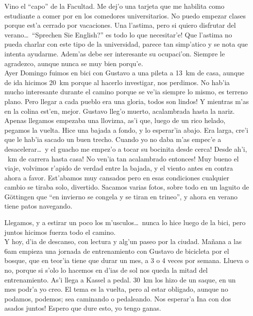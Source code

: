 Vino el ``capo'' de la Facultad. Me dej'o una tarjeta que me habilita como
estudiante a comer por  en los comedores universitarios. No
puedo empezar clases porque est'a cerrado por vacaciones. Una l'astima, pero si
quiero disfrutar del verano\ldots\ \textexclamdown ``Sprechen Sie English?'' es
todo lo que necesitar'e! Que l'astima no pueda charlar con este tipo de la
universidad, parece tan simp'atico y se nota que intenta ayudarme. Adem'as debe
ser interesante su ocupaci'on. Siempre le agradezco, aunque nunca se muy bien
porqu'e.\\

Ayer Domingo fuimos en bici con Gustavo a una pileta a 13~km de casa, aunque de
ida hicimos 20~km porque al hacerlo investigar, nos perdimos. No hab'ia mucho
interesante durante el camino porque se ve'ia siempre lo mismo, es terreno
plano. Pero llegar a cada pueblo era una gloria, \textexclamdown todos son
lindos! Y mientras m'as en la colina est'en, mejor. Gustavo lleg'o muerto,
acalambrada hasta la nariz. Apenas llegamos empezaba una llovizna, as'i que,
luego de un rico helado, pegamos la vuelta. Hice una bajada a fondo, y lo
esperar'ia abajo. Era larga, cre'i que le hab'ia sacado un buen trecho. Cuando
yo no daba m'as empec'e a desacelerar\ldots\ \textexclamdown y el guacho me
empez'o a tocar su bocinita desde cerca! Desde ah'i, ~km de
carrera hasta casa! \textexclamdown No ven'ia tan acalambrado entonces! Muy
bueno el viaje, volvimos r'apido de verdad entre la bajada, y el viento antes en
contra ahora a favor. Est'abamos muy cansados pero en esas condiciones cualquier
cambio se tiraba solo, divertido. Sacamos varias fotos, sobre todo en un laguito
de G\"ottingen que ``en invierno se congela y se tiran en trineo'', y ahora en
verano tiene patos navegando.

Llegamos, y a estirar un poco los m'usculos\ldots\ nunca lo hice luego de la
bici, pero juntos hicimos fuerza todo el camino.\\

Y hoy, d'ia de descanso, con lectura y alg'un paseo por la ciudad. Ma\~nana a
las 6am empieza una jornada de entrenamiento con Gustavo de bicicleta por el
bosque, que en teor'ia tiene que durar un mes, a 3 o 4 veces por semana. Llueva
o no, porque si s'olo lo hacemos en d'ias de sol nos queda la mitad del
entrenamiento. As'i llega a Kassel a pedal. 30~km los hizo de un saque, en un
mes podr'a yo creo. El tema es la vuelta, pero al estar obligado, aunque no
podamos, podemos; sea caminando o pedaleando. \textexclamdown Nos esperar'a Ina
con dos asados juntos! Espero que dure esto, yo tengo ganas.

